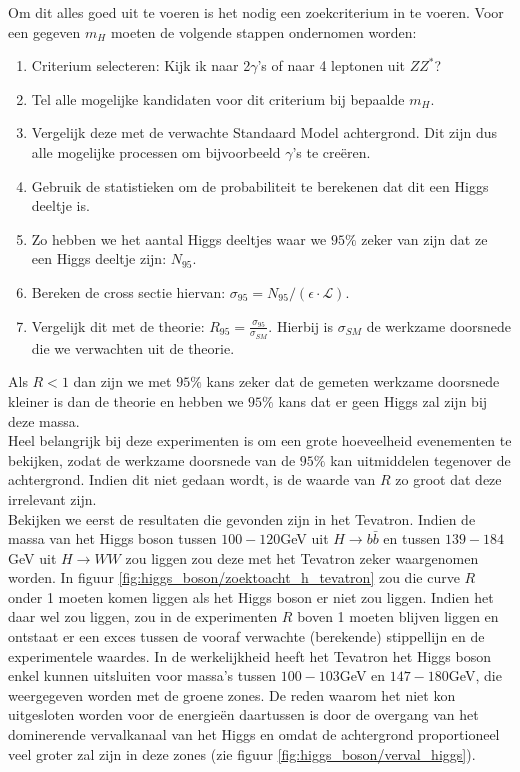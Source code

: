 \documentclass[../main.tex]{subfiles}
\begin{document}
Om dit alles goed uit te voeren is het nodig een zoekcriterium in te voeren. Voor een gegeven $m_H$ moeten de volgende stappen ondernomen worden:
\begin{enumerate}
    \item Criterium selecteren: Kijk ik naar 2$\gamma$'s of naar 4 leptonen uit $ZZ^*$?
    \item Tel alle mogelijke kandidaten voor dit criterium bij bepaalde $m_H$.
    \item Vergelijk deze met de verwachte Standaard Model achtergrond. Dit zijn dus alle mogelijke processen om bijvoorbeeld $\gamma$'s te creëren.
    \item Gebruik de statistieken om de probabiliteit te berekenen dat dit een Higgs deeltje is.
    \item Zo hebben we het aantal Higgs deeltjes waar we $95\%$ zeker van zijn dat ze een Higgs deeltje zijn: $N_{95}$.
    \item Bereken de cross sectie hiervan: $\sigma_{95}=N_{95} /(\epsilon \cdot \mathcal{L})$.
    \item Vergelijk dit met de theorie: $R_{95}=\frac{\sigma_{95}}{\sigma_{S M}}$. Hierbij is $\sigma_{S M}$ de werkzame doorsnede die we verwachten uit de theorie.
\end{enumerate}
Als $R<1$ dan zijn we met $95\%$ kans zeker dat de gemeten werkzame doorsnede kleiner is dan de theorie en hebben we $95\%$ kans dat er geen Higgs zal zijn bij deze massa.\\
Heel belangrijk bij deze experimenten is om een grote hoeveelheid evenementen te bekijken, zodat de werkzame doorsnede van de $95\%$ kan uitmiddelen tegenover de achtergrond. Indien dit niet gedaan wordt, is de waarde van $R$ zo groot dat deze irrelevant zijn.\\
Bekijken we eerst de resultaten die gevonden zijn in het Tevatron. Indien de massa van het Higgs boson tussen $100-120$GeV uit $H \rightarrow b \bar{b}$ en tussen $139-184$GeV uit $H \rightarrow W W$ zou liggen zou deze met het Tevatron zeker waargenomen worden. In figuur \ref{fig:higgs_boson/zoektoacht_h_tevatron} zou die curve $R$ onder 1 moeten komen liggen als het Higgs boson er niet zou liggen. Indien het daar wel zou liggen, zou in de experimenten $R$ boven 1 moeten blijven liggen en ontstaat er een exces tussen de vooraf verwachte (berekende) stippellijn en de experimentele waardes. In de werkelijkheid heeft het Tevatron het Higgs boson enkel kunnen uitsluiten voor massa's tussen $100-103$GeV en $147-180$GeV, die weergegeven worden met de groene zones. De reden waarom het niet kon uitgesloten worden voor de energieën daartussen is door de overgang van het dominerende vervalkanaal van het Higgs en omdat de achtergrond proportioneel veel groter zal zijn in deze zones (zie figuur \ref{fig:higgs_boson/verval_higgs}).
\end{document}
